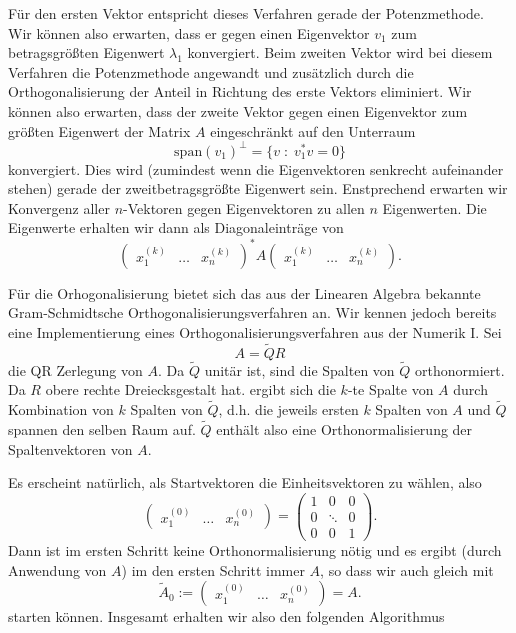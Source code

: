 \documentclass[
]{mycourse}
\theoremstyle{mythm}
\theoremstyle{break}
\newcommand{\dd}{\; : \;}    			      	%
\begin{document}
Für den ersten Vektor entspricht dieses Verfahren gerade der Potenzmethode. Wir können also erwarten, dass er gegen einen Eigenvektor $v_1$
zum betragsgrößten Eigenwert $\lambda_1$ konvergiert. Beim zweiten Vektor wird bei diesem Verfahren die Potenzmethode angewandt und zusätzlich
durch die Orthogonalisierung der Anteil in Richtung des erste Vektors eliminiert. Wir können also erwarten, dass der zweite Vektor gegen einen Eigenvektor zum größten
Eigenwert der Matrix $A$ eingeschränkt auf den Unterraum
\[
\mathrm{span}(v_1)^\perp=\{ v\dd v_1^* v=0\}
\]
konvergiert. Dies wird (zumindest wenn die Eigenvektoren senkrecht aufeinander stehen) gerade der zweitbetragsgrößte Eigenwert sein. Enstprechend erwarten wir Konvergenz
aller $n$-Vektoren gegen Eigenvektoren zu allen $n$ Eigenwerten.
Die Eigenwerte erhalten wir dann als Diagonaleinträge von 
\[
\begin{pmatrix} x^{(k)}_1 & \ldots & x^{(k)}_n \end{pmatrix}^* A \begin{pmatrix} x^{(k)}_1 & \ldots & x^{(k)}_n \end{pmatrix}.
\]

Für die Orhogonalisierung bietet sich das aus der Linearen Algebra bekannte Gram-Schmidtsche Orthogonalisierungsverfahren an. Wir kennen jedoch bereits
eine Implementierung eines Orthogonalisierungsverfahren aus der Numerik I. Sei
\[
A=\tilde QR
\]
die QR Zerlegung von $A$. Da $\tilde Q$ unitär ist, sind die Spalten von $\tilde Q$ orthonormiert.  Da $R$ obere rechte Dreiecksgestalt hat. ergibt sich
die $k$-te Spalte von $A$ durch Kombination von $k$ Spalten von $\tilde Q$, d.h. die jeweils ersten $k$ Spalten von $A$ und $\tilde Q$ spannen den selben Raum auf.
$\tilde Q$ enthält also eine Orthonormalisierung der Spaltenvektoren von $A$.

Es erscheint natürlich, als Startvektoren die Einheitsvektoren zu wählen, also
\[
\begin{pmatrix} x^{(0)}_1 & \ldots & x^{(0)}_n \end{pmatrix}=\begin{pmatrix} 1 & 0 & 0\\ 0 & \ddots & 0\\ 0 & 0 & 1\end{pmatrix}.
\]
Dann ist im ersten Schritt keine Orthonormalisierung nötig und es ergibt (durch Anwendung von $A$) 
im den ersten Schritt immer $A$, so dass wir auch gleich mit 
\[
\tilde A_0:=\begin{pmatrix} x^{(0)}_1 & \ldots & x^{(0)}_n \end{pmatrix}=A.
\]
starten können. Insgesamt erhalten wir also den folgenden Algorithmus
\end{document}
